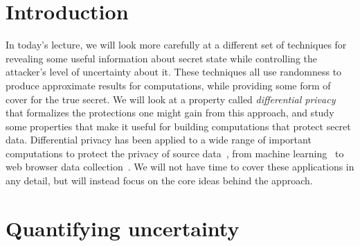 \documentclass[11pt,twoside]{scrartcl}
\begin{document}
\newcommand{\atrace}{\omega}%
\newcommand{\stdI}{\dTLint[state=\omega]}%
\newcommand{\Ip}{\dTLint[trace=\atrace]}%
\newcommand{\ws}{\omega}\newcommand{\wt}{\nu}%

\maketitle
\thispagestyle{empty}


\section{Introduction}

In today's lecture, we will look more carefully at a different set of techniques for revealing some useful information about secret state while controlling the attacker's level of uncertainty about it. These techniques all use randomness to produce approximate results for computations, while providing some form of cover for the true secret. We will look at a property called \emph{differential privacy}~\cite{dwork06} that formalizes the protections one might gain from this approach, and study some properties that make it useful for building computations that protect secret data. Differential privacy has been applied to a wide range of important computations to protect the privacy of source data~\cite{Dwork2014}, from machine learning~\cite{Chaudhuri2011} to web browser data collection~\cite{ErlingssonKP14}. We will not have time to cover these applications in any detail, but will instead focus on the core ideas behind the approach.

\section{Quantifying uncertainty}

\end{document}
